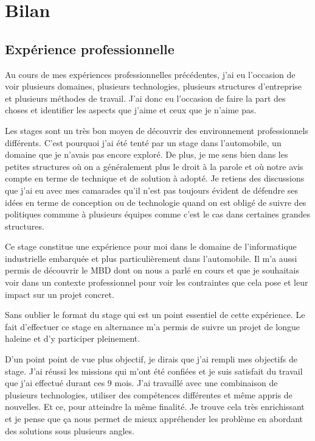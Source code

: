 \chapter{Bilan}

\section*{Expérience professionnelle}
Au cours de mes expériences professionnelles précédentes, j'ai eu l'occasion de voir plusieurs domaines,
plusieurs technologies, plusieurs structures d'entreprise et plusieurs méthodes de travail. J'ai donc eu l'occasion
de faire la part des choses et identifier les aspects que j'aime et ceux que je n'aime pas.

Les stages sont un très bon moyen de découvrir des environnement professionnels différents. C'est pourquoi
j'ai été tenté par un stage dans l'automobile, un domaine que je n'avais pas encore exploré. De plus, je me sens
bien dans les petites structures où on a généralement plus le
droit à la parole et où notre avis compte en terme de technique et de solution à adopté. Je retiens des discussions que
j'ai eu avec mes camarades qu'il n'est pas toujours évident de défendre ses idées en terme de conception ou
de technologie quand on est obligé de suivre des politiques commune à plusieurs équipes comme c'est le cas dans
certaines grandes structures.

Ce stage constitue une expérience pour moi dans le domaine de l'informatique industrielle embarquée et plus
particulièrement dans l'automobile. Il m'a aussi permis de découvrir le MBD dont on nous a parlé en cours et
que je souhaitais voir dans un contexte professionnel pour voir les contraintes que cela pose et leur impact
sur un projet concret.

Sans oublier le format du stage qui est un point essentiel de cette expérience. Le fait d'effectuer ce stage en alternance
m'a permis de suivre un projet de longue haleine et d'y participer pleinement.

D'un point point de vue plus objectif, je dirais que j'ai rempli mes objectifs de stage.
J'ai réussi les missions qui m'ont été confiées et je suis satisfait du travail que j'ai effectué durant ces 9 mois.
J'ai travaillé avec une combinaison de plusieurs technologies, utiliser des compétences différentes et même
appris de nouvelles. Et ce, pour atteindre la même finalité. Je trouve cela très enrichissant et je pense que ça
nous permet de mieux appréhender les problème en abordant des solutions sous plusieurs angles.

